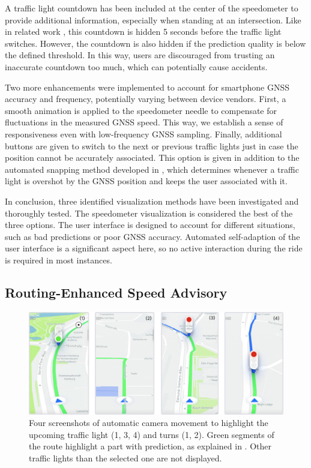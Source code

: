 A traffic light countdown has been included at the center of the speedometer to provide additional information, especially when standing at an intersection. Like in related work \cite{stahlmann_exploring_2018, sokolov_effects_2018}, this countdown is hidden 5 seconds before the traffic light switches. However, the countdown is also hidden if the prediction quality is below the defined threshold. In this way, users are discouraged from trusting an inaccurate countdown too much, which can potentially cause accidents.

Two more enhancements were implemented to account for smartphone GNSS accuracy and frequency, potentially varying between device vendors. First, a smooth animation is applied to the speedometer needle to compensate for fluctuations in the measured GNSS speed. This way, we establish a sense of responsiveness even with low-frequency GNSS sampling. Finally, additional buttons are given to switch to the next or previous traffic lights just in case the position cannot be accurately associated. This option is given in addition to the automated snapping method developed in , which determines whenever a traffic light is overshot by the GNSS position and keeps the user associated with it.

In conclusion, three identified visualization methods have been investigated and thoroughly tested. The speedometer visualization is considered the best of the three options. The user interface is designed to account for different situations, such as bad predictions or poor GNSS accuracy. Automated self-adaption of the user interface is a significant aspect here, so no active interaction during the ride is required in most instances.

\subsection{Routing-Enhanced Speed Advisory}

\begin{figure}[t]
\centering
\includegraphics[width=\linewidth]{images/camera-controller.pdf}
\caption{Four screenshots of automatic camera movement to highlight the upcoming traffic light (1, 3, 4) and turns (1, 2). Green segments of the route highlight a part with prediction, as explained in . Other traffic lights than the selected one are not displayed.}
\label{fig:camera-controller}
\end{figure}

